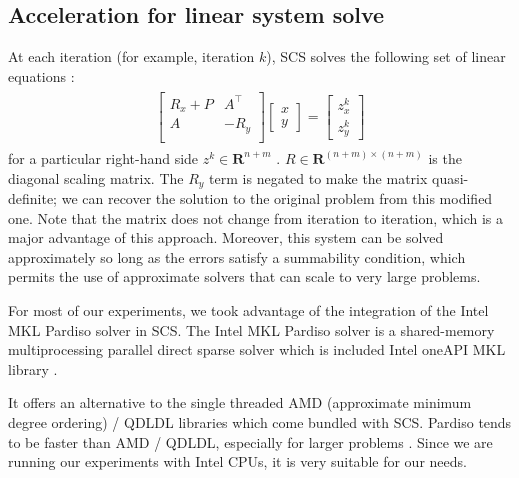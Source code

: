 \subsection{Acceleration for linear system solve}
At each iteration (for example, iteration $k$), SCS solves the following set
of linear equations \cite{linSolve}:
\begin{align}
    \begin{split}\begin{bmatrix}
            R_x + P & A^\top \\
            A       & -R_y   \\
        \end{bmatrix}
        \begin{bmatrix}
            x \\
            y
        \end{bmatrix}
        =
        \begin{bmatrix}
            z^k_x \\
            z^k_y
        \end{bmatrix}\end{split}
\end{align}
for a particular right-hand side $z^k \in \mathbf{R}^{n+m}$
. $R \in \mathbf{R}^{(n+m) \times (n+m)}$ is the diagonal scaling matrix.
The $R_y$ term is negated to make the matrix quasi-definite; we can recover
the solution to the original problem from this modified one. Note that the matrix does not change from
iteration to iteration, which is a major advantage of this approach. Moreover, this system can be solved approximately
so long as the errors satisfy a summability condition, which permits the use of approximate
solvers that can scale to very large problems.


For most of our experiments, we took advantage of the integration of the Intel MKL Pardiso solver in
SCS. The Intel MKL Pardiso solver is a shared-memory multiprocessing parallel direct sparse
solver which is included Intel oneAPI MKL library \cite{linSolve}.

It offers an alternative to the single threaded AMD (approximate minimum degree ordering) / QDLDL libraries which come bundled with SCS.
Pardiso tends to be faster than AMD / QDLDL, especially for larger problems \cite{linSolve}.
Since we are running our experiments
with Intel CPUs, it is very suitable for our needs.


